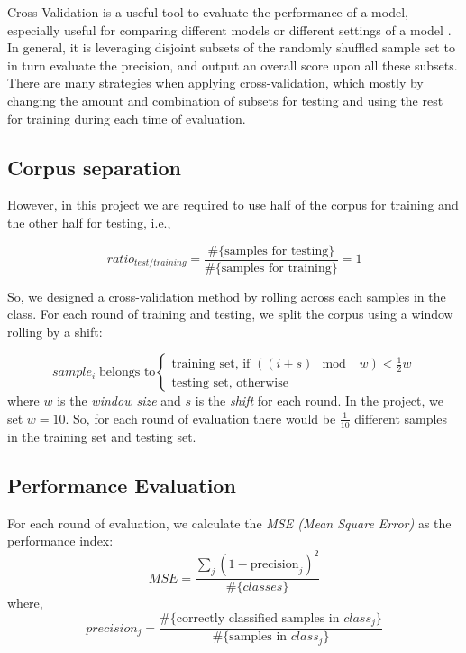 \documentclass{article}
\begin{document}
Cross Validation is a useful tool to evaluate the performance of a model, especially useful for comparing different models or different settings of a model \cite{cross-validation}. In general, it is leveraging disjoint subsets of the randomly shuffled sample set to in turn evaluate the precision, and output an overall score upon all these subsets. There are many strategies when applying cross-validation, which mostly by changing the amount and combination of subsets for testing and using the rest for training during each time of evaluation. 

\subsection{Corpus separation}
However, in this project we are required to use half of the corpus for training and the other half for testing, i.e., 

\begin{equation} \label{eq:training-ratio}
	ratio_{test/training} = \frac{\#\{\text{samples for testing}\}}{\#\{\text{samples for training}\}} = 1
\end{equation}

So, we designed a cross-validation method by rolling across each samples in the class. For each round of training and testing, we split the corpus using a window rolling by a shift:

\begin{equation} \label{eq:roll-samples}
	sample_i \; \text{belongs to} \begin{cases}
		\text{training set, if $((i + s)\mod \;\; w)< \frac{1}{2} w $}  \\
		\text{testing set, otherwise}
	\end{cases}
\end{equation}
where $w$ is the \textit{window size} and $s$ is the \textit{shift} for each round. In the project, we set $w=10$. So, for each round of evaluation there would be $\frac{1}{10}$ different samples in the training set and testing set.

\subsection{Performance Evaluation}
For each round of evaluation, we calculate the \textit{MSE (Mean Square Error)} as the performance index:
\begin{equation} \label{eq:mse}
	MSE = \frac{\sum_j {(1-\text{precision}_j)^2}}{\#\{classes\}} 
\end{equation}
where,
\begin{equation} \label{eq:precision}
	precision_j = \frac{\# \{\text{correctly classified samples in $class_j$} \} }{\#\{\text{samples in $class_j$}\}} 
\end{equation}
\end{document}
